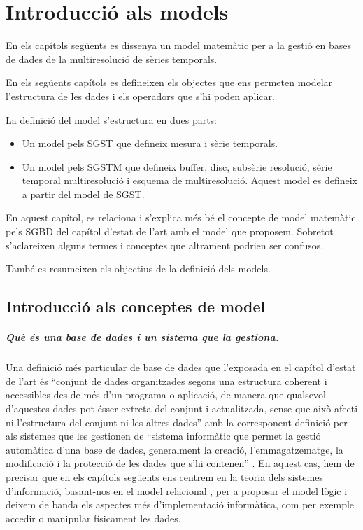 \chapter{Introducció als models}


\todo{}

En els capítols següents es dissenya un model matemàtic per a la
gestió en bases de dades de la multiresolució de sèries temporals.

En els següents capítols es defineixen els objectes que ens permeten
modelar l'estructura de les dades i els operadors que s'hi poden
aplicar.

La definició del model s'estructura en dues parts:

\begin{itemize}
\item Un model pels \gls{SGST}  que defineix mesura i sèrie temporals.
\item Un model pels \gls{SGSTM} que defineix buffer, disc, subsèrie
  resolució, sèrie temporal multiresolució i esquema de
  multiresolució. Aquest model es defineix a partir del model de \gls{SGST}.
\end{itemize}



  
En aquest capítol, es relaciona i s'explica més bé el concepte de
model matemàtic pels \gls{SGBD} del capítol d'estat de l'art
 amb el model que proposem. Sobretot s'aclareixen alguns termes i conceptes que altrament podrien ser confusos. 

També es resumeixen els objectius de la definició dels models.




\section{Introducció als conceptes de model}

\paragraph{Què és una base de dades i un sistema que la gestiona.}
Una definició més particular de base de dades que l'exposada en el
capítol d'estat de l'art  és ``conjunt de dades organitzades
segons una estructura coherent i accessibles des de més d'un programa
o aplicació, de manera que qualsevol d'aquestes dades pot ésser
extreta del conjunt i actualitzada, sense que això afecti ni
l'estructura del conjunt ni les altres dades'' \parencite[s.~v.~base
de dades]{termcat} amb la corresponent definició per als sistemes que
les gestionen de ``sistema informàtic que permet la gestió automàtica
d'una base de dades, generalment la creació, l'emmagatzematge, la
modificació i la protecció de les dades que s'hi
contenen'' \parencite[s.~v.~sistema de gestió de bases de
dades]{termcat}.  En aquest cas, hem de precisar que en els capítols
següents ens centrem en la teoria dels sistemes d'informació,
basant-nos en el model relacional \parencite{date04:introduction8},
per a proposar el model lògic i deixem de banda els aspectes més
d'implementació informàtica, com per exemple accedir o manipular
físicament les dades.

